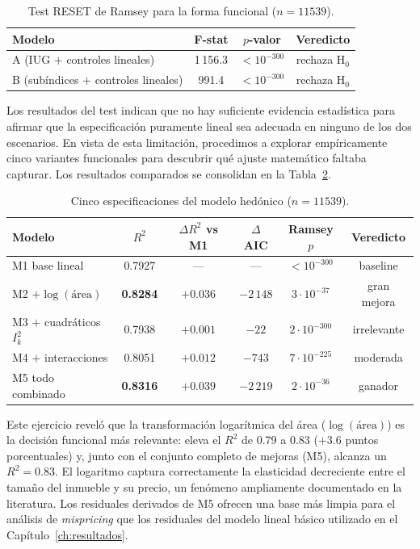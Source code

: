 \documentclass[12pt, a4paper, twoside, openright]{report}
\theoremstyle{plain}
\theoremstyle{definition}
\begin{document}
\begin{table}[htbp]
\centering
\caption{Test RESET de Ramsey para la forma funcional ($n = \num{11539}$).}
\label{tab:ramsey_validez}
\small
\begin{tabular}{@{}lccc@{}}
\toprule
\textbf{Modelo} & \textbf{F-stat} & $p$\textbf{-valor} & \textbf{Veredicto} \\
\midrule
A (IUG $+$ controles lineales)        & 1\,156.3 & $< 10^{-300}$ & rechaza H$_0$ \\
B (subíndices $+$ controles lineales) &   991.4 & $< 10^{-300}$ & rechaza H$_0$ \\
\bottomrule
\end{tabular}
\end{table}

Los resultados del test indican que no hay suficiente evidencia estadística para afirmar que la especificación puramente lineal sea adecuada en ninguno de los dos escenarios. En vista de esta limitación, procedimos a explorar empíricamente cinco variantes funcionales para descubrir qué ajuste matemático faltaba capturar. Los resultados comparados se consolidan en la Tabla~\ref{tab:specs_validez}.

\begin{table}[htbp]
\centering
\caption{Cinco especificaciones del modelo hedónico ($n = \num{11539}$).}
\label{tab:specs_validez}
\small
\begin{tabular}{@{}lccccc@{}}
\toprule
\textbf{Modelo} & $R^2$ & $\Delta R^2$ \textbf{vs M1} & $\Delta$AIC & \textbf{Ramsey} $p$ & \textbf{Veredicto} \\
\midrule
M1 base lineal & 0.7927 & --- & --- & $< 10^{-300}$ & baseline \\
M2 $+ \log(\text{\'area})$ & \textbf{0.8284} & \textbf{$+0.036$} & $-2\,148$ & $3 \cdot 10^{-37}$ & gran mejora \\
M3 $+$ cuadráticos $I_k^2$ & 0.7938 & $+0.001$ & $-22$ & $2 \cdot 10^{-300}$ & irrelevante \\
M4 $+$ interacciones & 0.8051 & $+0.012$ & $-743$ & $7 \cdot 10^{-225}$ & moderada \\
M5 todo combinado & \textbf{0.8316} & \textbf{$+0.039$} & $-2\,219$ & $2 \cdot 10^{-36}$ & ganador \\
\bottomrule
\end{tabular}
\end{table}

Este ejercicio reveló que la transformación logarítmica del área ($\log(\text{\'area})$) es la decisión funcional más relevante: eleva el $R^2$ de 0.79 a 0.83 ($+3.6$ puntos porcentuales) y, junto con el conjunto completo de mejoras (M5), alcanza un $R^2 = 0.83$. El logaritmo captura correctamente la elasticidad decreciente entre el tamaño del inmueble y su precio, un fenómeno ampliamente documentado en la literatura. Los residuales derivados de M5 ofrecen una base más limpia para el análisis de \emph{mispricing} que los residuales del modelo lineal básico utilizado en el Capítulo~\ref{ch:resultados}.
\end{document}
